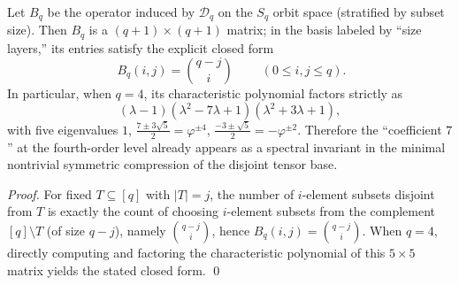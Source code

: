 \begin{proposition}\label{prop:pom-disjointness-symmetric-compression-bq}
Let \(B_q\) be the operator induced by \(\mathcal{D}_q\) on the \(S_q\) orbit space (stratified by subset size).
Then \(B_q\) is a \((q+1)\times(q+1)\) matrix; in the basis labeled by ``size layers,'' its entries satisfy the explicit closed form
\[
\boxed{\;B_q(i,j)=\binom{q-j}{i}\;}\qquad(0\le i,j\le q).
\]
In particular, when \(q=4\), its characteristic polynomial factors strictly as
\[
(\lambda-1)(\lambda^2-7\lambda+1)(\lambda^2+3\lambda+1),
\]
with five eigenvalues
\(
1
\), \(
\frac{7\pm 3\sqrt5}{2}=\varphi^{\pm 4}
\), \(
\frac{-3\pm\sqrt5}{2}=-\varphi^{\pm 2}
\).
Therefore the ``coefficient \(7\)'' at the fourth-order level already appears as a spectral invariant in the minimal nontrivial symmetric compression of the disjoint tensor base.
\end{proposition}
\begin{proof}
For fixed \(T\subseteq[q]\) with \(|T|=j\), the number of \(i\)-element subsets disjoint from \(T\) is exactly the count of choosing \(i\)-element subsets from the complement \([q]\setminus T\) (of size \(q-j\)), namely \(\binom{q-j}{i}\), hence \(B_q(i,j)=\binom{q-j}{i}\).
When \(q=4\), directly computing and factoring the characteristic polynomial of this \(5\times 5\) matrix yields the stated closed form. \qed
\end{proof}



